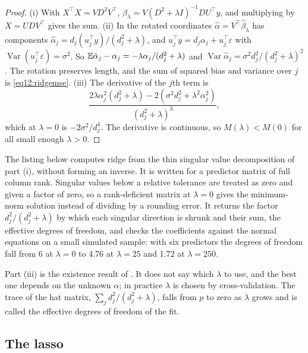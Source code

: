\begin{chapterrefs}
\begin{proof}
(i) With $X^\top X=VD^2V^\top$, $\hat\beta_\lambda=V(D^2+\lambda I)^{-1}DU^\top y$, and multiplying by
$X=UDV^\top$ gives the sum. (ii) In the rotated coordinates $\hat\alpha=V^\top\hat\beta_\lambda$ has
components $\hat\alpha_j=d_j(u_j^\top y)/(d_j^2+\lambda)$, and $u_j^\top y=d_j\alpha_j+u_j^\top\varepsilon$
with $\operatorname{Var}(u_j^\top\varepsilon)=\sigma^2$. So $\mathbb{E}\hat\alpha_j-\alpha_j=-\lambda\alpha_j/(d_j^2+\lambda)$
and $\operatorname{Var}\hat\alpha_j=\sigma^2d_j^2/(d_j^2+\lambda)^2$. The rotation preserves length, and the sum
of squared bias and variance over $j$ is \cref{eq12:ridgemse}. (iii) The derivative of the $j$th term is
\[
  \frac{2\lambda\alpha_j^2(d_j^2+\lambda)-2(\sigma^2d_j^2+\lambda^2\alpha_j^2)}{(d_j^2+\lambda)^3},
\]
which at $\lambda=0$ is $-2\sigma^2/d_j^4$. The derivative is continuous, so $M(\lambda)<M(0)$ for all small
enough $\lambda>0$.
\end{proof}

The listing below computes ridge from the thin singular value decomposition of part (i), without
forming an inverse. It is written for a predictor matrix of full column rank. Singular values below a
relative tolerance are treated as zero and given a factor of zero, so a rank-deficient matrix at
$\lambda=0$ gives the minimum-norm solution instead of dividing by a rounding error. It returns the factor $d_j^2/(d_j^2+\lambda)$ by which each singular direction is
shrunk and their sum, the effective degrees of freedom, and checks the coefficients against the normal
equations on a small simulated sample: with six predictors the degrees of freedom fall from 6 at
$\lambda=0$ to 4.76 at $\lambda=25$ and 1.72 at $\lambda=250$.


Part (iii) is the existence result of \textcite{hoerl1970}. It does not say which $\lambda$ to use, and
the best one depends on the unknown $\alpha$; in practice $\lambda$ is chosen by cross-validation. The
trace of the hat matrix, $\sum_jd_j^2/(d_j^2+\lambda)$, falls from $p$ to zero as $\lambda$ grows and is
called the effective degrees of freedom of the fit.

\subsection{The lasso}


\end{chapterrefs}
